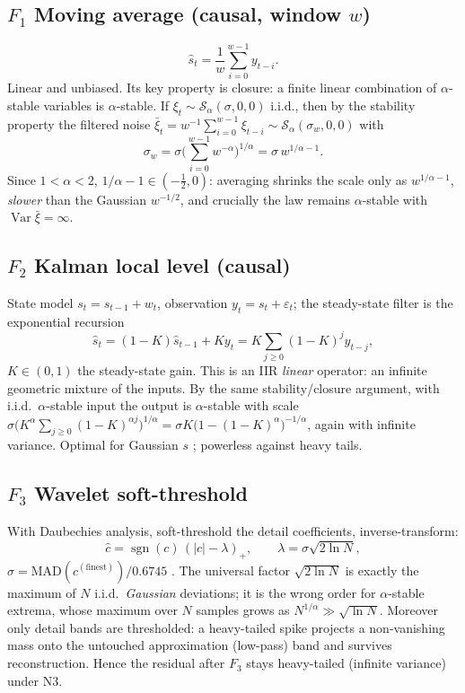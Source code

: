 \documentclass[conference]{IEEEtran}
\newcommand{\Sstable}{\mathcal{S}_\alpha}
\DeclareMathOperator{\Var}{Var}
\DeclareMathOperator{\sgn}{sgn}
\begin{document}
\subsection{$F_1$ Moving average (causal, window $w$)}
\begin{equation}
\hat s_t=\frac1w\sum_{i=0}^{w-1}y_{t-i}.
\end{equation}
Linear and unbiased. Its key property is closure: a finite linear
combination of $\alpha$-stable variables is $\alpha$-stable. If
$\xi_t\sim\Sstable(\sigma,0,0)$ i.i.d., then by the stability property
the filtered noise
$\bar\xi_t=w^{-1}\sum_{i=0}^{w-1}\xi_{t-i}\sim\Sstable(\sigma_w,0,0)$
with
\begin{equation}
\sigma_w=\sigma\Big(\textstyle\sum_{i=0}^{w-1}w^{-\alpha}\Big)^{1/\alpha}
=\sigma\,w^{1/\alpha-1}. \label{eq:ma-scale}
\end{equation}
Since $1<\alpha<2$, $1/\alpha-1\in(-\tfrac12,0)$: averaging shrinks the
scale only as $w^{1/\alpha-1}$, \emph{slower} than the Gaussian
$w^{-1/2}$, and crucially the law remains $\alpha$-stable with
$\Var\bar\xi=\infty$.

\subsection{$F_2$ Kalman local level (causal)}
State model $s_t=s_{t-1}+w_t$, observation $y_t=s_t+\varepsilon_t$;
the steady-state filter is the exponential recursion
\begin{equation}
\hat s_t=(1-K)\hat s_{t-1}+K y_t
=K\sum_{j\ge0}(1-K)^{j}y_{t-j},
\end{equation}
$K\in(0,1)$ the steady-state gain. This is an IIR \emph{linear}
operator: an infinite geometric mixture of the inputs. By the same
stability/closure argument, with i.i.d.\ $\alpha$-stable input the
output is $\alpha$-stable with scale
$\sigma\big(K^\alpha\sum_{j\ge0}(1-K)^{\alpha j}\big)^{1/\alpha}
=\sigma K\big(1-(1-K)^\alpha\big)^{-1/\alpha}$, again with infinite
variance. Optimal for Gaussian $s$ \cite{kalman1960}; powerless against
heavy tails.

\subsection{$F_3$ Wavelet soft-threshold}
With Daubechies analysis, soft-threshold the detail coefficients,
inverse-transform:
\begin{equation}
\hat c=\sgn(c)\,(|c|-\lambda)_+,\qquad
\lambda=\hat\sigma\sqrt{2\ln N},
\end{equation}
$\hat\sigma=\mathrm{MAD}(c^{(\text{finest})})/0.6745$
\cite{donoho1994wavelets,donoho1995noising}. The universal factor
$\sqrt{2\ln N}$ is exactly the maximum of $N$ i.i.d.\ \emph{Gaussian}
deviations; it is the wrong order for $\alpha$-stable extrema, whose
maximum over $N$ samples grows as $N^{1/\alpha}\gg\sqrt{\ln N}$.
Moreover only detail bands are thresholded: a heavy-tailed spike
projects a non-vanishing mass onto the untouched approximation
(low-pass) band and survives reconstruction. Hence the residual after
$F_3$ stays heavy-tailed (infinite variance) under N3.
\end{document}
